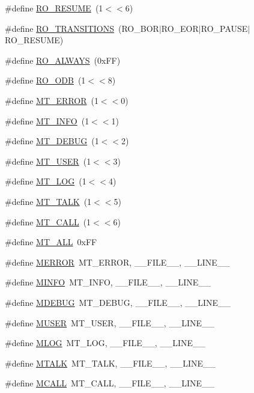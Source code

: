 \begin{DoxyCompactItemize}
\item 
\#define \hyperlink{group__mdefineh_ga549159f6ef3ef7c17261bcccecbe57ec}{RO\_\-RESUME}~(1$<$$<$6)
\item 
\#define \hyperlink{group__mdefineh_gadcbbd9e66d9455950d508d10b32b1f74}{RO\_\-TRANSITIONS}~(RO\_\-BOR$|$RO\_\-EOR$|$RO\_\-PAUSE$|$RO\_\-RESUME)
\item 
\#define \hyperlink{group__mdefineh_gafb61c915b4df610eb54eeeb781fc2f75}{RO\_\-ALWAYS}~(0xFF)
\item 
\#define \hyperlink{group__mdefineh_ga2de85e3b635c54456698533ebfc5635d}{RO\_\-ODB}~(1$<$$<$8)
\item 
\#define \hyperlink{group__mdefineh_gafb24605c905f91417535771185913d07}{MT\_\-ERROR}~(1$<$$<$0)
\item 
\#define \hyperlink{group__mdefineh_ga5bf211121ab25c5d13f8c2f272b9ca25}{MT\_\-INFO}~(1$<$$<$1)
\item 
\#define \hyperlink{group__mdefineh_gad357af6d472b906b1e269f94f68c97b3}{MT\_\-DEBUG}~(1$<$$<$2)
\item 
\#define \hyperlink{group__mdefineh_ga8e13ab6bdea106f548ecb162bdcd41a9}{MT\_\-USER}~(1$<$$<$3)
\item 
\#define \hyperlink{group__mdefineh_gaa2290e1318f8605a3e59acf7112ba738}{MT\_\-LOG}~(1$<$$<$4)
\item 
\#define \hyperlink{group__mdefineh_ga7d9c4230376d6527c7c8cd810eeb3e86}{MT\_\-TALK}~(1$<$$<$5)
\item 
\#define \hyperlink{group__mdefineh_gadcbf4bac0ba5a2fb4e81ed727775dbba}{MT\_\-CALL}~(1$<$$<$6)
\item 
\#define \hyperlink{group__mdefineh_ga3378bf6f53a24392145df33c8acc9c0c}{MT\_\-ALL}~0xFF
\item 
\#define \hyperlink{group__mdefineh_gac2d967025ca0f84f611d568f4ede934a}{MERROR}~MT\_\-ERROR, \_\-\_\-FILE\_\-\_\-, \_\-\_\-LINE\_\-\_\-
\item 
\#define \hyperlink{group__mdefineh_ga6e27d8876a43afce3ee4dd16527cbb9e}{MINFO}~MT\_\-INFO,  \_\-\_\-FILE\_\-\_\-, \_\-\_\-LINE\_\-\_\-
\item 
\#define \hyperlink{group__mdefineh_gad769dc7be0dc5189e019d56664a18655}{MDEBUG}~MT\_\-DEBUG, \_\-\_\-FILE\_\-\_\-, \_\-\_\-LINE\_\-\_\-
\item 
\#define \hyperlink{group__mdefineh_ga34e08186e736dbd7f0b61a23a8ad8d0f}{MUSER}~MT\_\-USER,  \_\-\_\-FILE\_\-\_\-, \_\-\_\-LINE\_\-\_\-
\item 
\#define \hyperlink{group__mdefineh_ga953a810cf5034c603bdcad8840223ddc}{MLOG}~MT\_\-LOG,   \_\-\_\-FILE\_\-\_\-, \_\-\_\-LINE\_\-\_\-
\item 
\#define \hyperlink{group__mdefineh_gad6a8d32f94873258d0eebcbe5b24a78e}{MTALK}~MT\_\-TALK,  \_\-\_\-FILE\_\-\_\-, \_\-\_\-LINE\_\-\_\-
\item 
\#define \hyperlink{group__mdefineh_ga9f2fa3417c41f059c815b9c0eba73db2}{MCALL}~MT\_\-CALL,  \_\-\_\-FILE\_\-\_\-, \_\-\_\-LINE\_\-\_\-
\end{DoxyCompactItemize}


